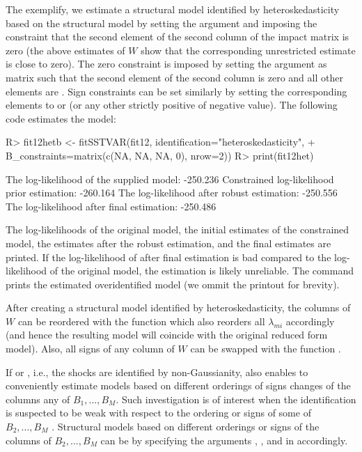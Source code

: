 \documentclass[nojss]{jss}
\begin{document}
The exemplify, we estimate a structural model identified by heteroskedasticity based on the structural model  by setting the argument  and imposing the constraint that the second element of the second column of the impact matrix is zero (the above estimates of $W$ show that the corresponding unrestricted estimate is close to zero). The zero constraint is imposed by setting the argument  as matrix such that the second element of the second column is zero and all other elements are . Sign constraints can be set similarly by setting the corresponding elements to  or  (or any other strictly positive of negative value). The following code estimates the model:
\begin{CodeChunk}
\begin{CodeInput}
R> fit12hetb <- fitSSTVAR(fit12, identification="heteroskedasticity",
+    B_constraints=matrix(c(NA, NA, NA, 0), nrow=2))
R> print(fit12het)
\end{CodeInput}
\begin{CodeOutput}
The log-likelihood of the supplied model:    -250.236
Constrained log-likelihood prior estimation: -260.164
The log-likelihood after robust estimation:  -250.556
The log-likelihood after final estimation:   -250.486
\end{CodeOutput}
\end{CodeChunk}
The log-likelihoods of the original model, the initial estimates of the constrained model, the estimates after the robust estimation, and the final estimates are printed. If the log-likelihood of after final estimation is bad compared to the log-likelihood of the original model, the estimation is likely unreliable. The command  prints the estimated overidentified model (we ommit the printout for brevity).

After creating a structural model identified by heteroskedasticity, the columns of $W$ can be reordered with the function  which also reorders all $\lambda_{mi}$ accordingly (and hence the resulting model will coincide with the original reduced form model). Also, all signs of any column of $W$ can be swapped with the function .

If  or , i.e., the shocks are identified by non-Gaussianity,  also enables to conveniently estimate models based on different orderings of signs changes of the columns any of $B_1,...,B_M$. Such investigation is of interest when the identification is suspected to be weak with respect to the ordering or signs of some of $B_2,...,B_M$ \citep[see Section~\ref{sec:ident_non_gauss}, and for further discussion]{Virolainen2:2024}. Structural models based on different orderings or signs of the columns of $B_2,...,B_M$ can be by specifying the arguments , , and  in  accordingly.
\end{document}
